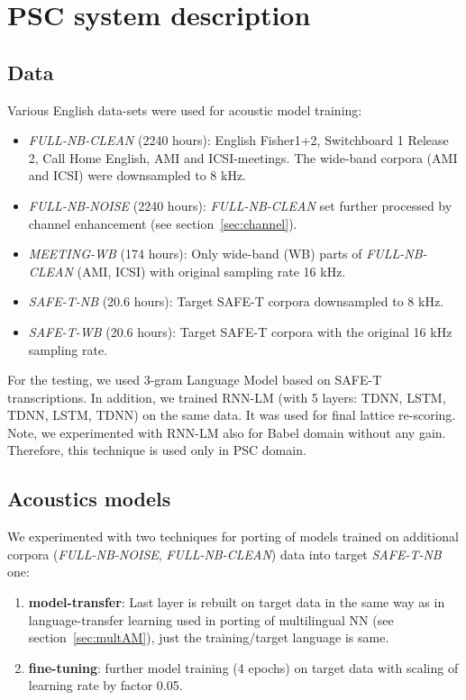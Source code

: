 \documentclass{article}
\begin{document}
\section{PSC system description}
\label{sec:psc}
\subsection{Data}
\label{sec:pscdata}
Various English data-sets were used for acoustic model training:
\begin{itemize}
    \item {\it FULL-NB-CLEAN} (2240 hours): English Fisher1+2, 
Switchboard 1 Release 2, Call Home English, AMI and ICSI-meetings. The
wide-band corpora (AMI and ICSI) were downsampled to 8 kHz.
    \item {\it FULL-NB-NOISE} (2240 hours): {\it FULL-NB-CLEAN} set further processed by channel enhancement (see section~\ref{sec:channel}).
    \item {\it MEETING-WB} (174 hours): Only wide-band (WB) parts of {\it
      FULL-NB-CLEAN} (AMI, ICSI) with original sampling rate 16 kHz.
    \item {\it SAFE-T-NB} (20.6 hours):
      Target SAFE-T corpora downsampled to 8 kHz.
    \item {\it SAFE-T-WB} (20.6 hours):
      Target SAFE-T corpora with the original 16 kHz sampling rate.
\end{itemize}

For the testing, we used 3-gram Language Model based on SAFE-T transcriptions. In
addition, we trained RNN-LM (with 5 layers: TDNN, LSTM, TDNN, LSTM, TDNN)
on the same data. It was used for final lattice re-scoring.
Note, we experimented with RNN-LM also for Babel domain without any gain. Therefore, this technique is used only in PSC domain.



\subsection{Acoustics models}
\label{sec:pscAM}

We experimented with two techniques for porting of models trained on
additional corpora ({\it FULL-NB-NOISE}, {\it FULL-NB-CLEAN}) data into target {\it SAFE-T-NB} one: 
\begin{enumerate}
    \item {\bf model-transfer}: Last layer is rebuilt on target data
      in the same way as in language-transfer learning used in porting
      of multilingual NN (see section~\ref{sec:multAM}), just the
      training/target language is same.
    \item {\bf fine-tuning}: further model training (4 epochs) on target data with scaling of learning rate by factor 0.05. 
\end{enumerate}
\end{document}
